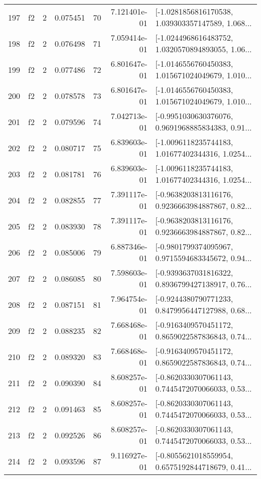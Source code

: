 \begin{tabular}{lllrlrl}
197 &  f2 &   2 &  0.075451 &   70 &  7.121401e-01 &  [-1.0281856816170538, 1.039303357147589, 1.068... \\
198 &  f2 &   2 &  0.076498 &   71 &  7.059414e-01 &  [-1.0244968616483752, 1.0320570894893055, 1.06... \\
199 &  f2 &   2 &  0.077486 &   72 &  6.801647e-01 &  [-1.0146556760450383, 1.015671024049679, 1.010... \\
200 &  f2 &   2 &  0.078578 &   73 &  6.801647e-01 &  [-1.0146556760450383, 1.015671024049679, 1.010... \\
201 &  f2 &   2 &  0.079596 &   74 &  7.042713e-01 &  [-0.9951030630376076, 0.9691968885834383, 0.91... \\
202 &  f2 &   2 &  0.080717 &   75 &  6.839603e-01 &  [-1.0096118235744183, 1.01677402344316, 1.0254... \\
203 &  f2 &   2 &  0.081781 &   76 &  6.839603e-01 &  [-1.0096118235744183, 1.01677402344316, 1.0254... \\
204 &  f2 &   2 &  0.082855 &   77 &  7.391117e-01 &  [-0.9638203813116176, 0.9236663984887867, 0.82... \\
205 &  f2 &   2 &  0.083930 &   78 &  7.391117e-01 &  [-0.9638203813116176, 0.9236663984887867, 0.82... \\
206 &  f2 &   2 &  0.085006 &   79 &  6.887346e-01 &  [-0.9801799374095967, 0.9715594683345672, 0.94... \\
207 &  f2 &   2 &  0.086085 &   80 &  7.598603e-01 &  [-0.9393637031816322, 0.8936799427138917, 0.76... \\
208 &  f2 &   2 &  0.087151 &   81 &  7.964754e-01 &  [-0.9244380790771233, 0.8479956447127988, 0.68... \\
209 &  f2 &   2 &  0.088235 &   82 &  7.668468e-01 &  [-0.9163409570451172, 0.8659022587836843, 0.74... \\
210 &  f2 &   2 &  0.089320 &   83 &  7.668468e-01 &  [-0.9163409570451172, 0.8659022587836843, 0.74... \\
211 &  f2 &   2 &  0.090390 &   84 &  8.608257e-01 &  [-0.8620330307061143, 0.7445472070066033, 0.53... \\
212 &  f2 &   2 &  0.091463 &   85 &  8.608257e-01 &  [-0.8620330307061143, 0.7445472070066033, 0.53... \\
213 &  f2 &   2 &  0.092526 &   86 &  8.608257e-01 &  [-0.8620330307061143, 0.7445472070066033, 0.53... \\
214 &  f2 &   2 &  0.093596 &   87 &  9.116927e-01 &  [-0.8055621018559954, 0.6575192844718679, 0.41... \\

\end{tabular}
